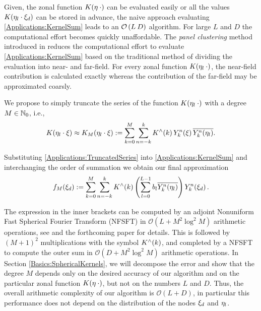 \documentclass[11pt,a4paper,twoside,bibtotoc]{scrartcl}
\theoremstyle{plain}
\theoremstyle{definition}
\theoremstyle{remark}
\numberwithin{equation}{section}
\numberwithin{table}{section}
\numberwithin{figure}{section}
\begin{document}
Given, the zonal function $K{\hspace{-0.4ex}}\left(\mathbf{\eta} \: \cdot\right)$ can be evaluated easily
or all the values $K{\hspace{-0.4ex}}\left(\mathbf{\eta}_{l} \cdot \mathbf{\xi}_{d}\right)$ can be stored in
advance, the naive approach evaluating \eqref{Applications:KernelSum} leads to
an $\mathcal{O}\left(L\:D\right)$ algorithm. 
For large $L$ and $D$ the computational effort becomes quickly unaffordable.
The \emph{panel clustering} method introduced in \cite{FrGlSch98} reduces the
computational effort to evaluate \eqref{Applications:KernelSum} based on the
traditional method of dividing the evaluation into near- and far-field.
For every zonal function $K{\hspace{-0.4ex}}\left(\mathbf{\eta}_l \: \cdot\right)$, the near-field contribution
is calculated exactly whereas the contribution of the far-field may be
approximated coarsly.

We propose to simply truncate the series of the function
$K{\hspace{-0.4ex}}\left(\mathbf{\eta}_{l}\: \cdot\right)$ with a degree $M \in \mathbb{N}_{0}$, i.e.,
\begin{equation}
  \label{Applications:TruncatedSeries}
  K{\hspace{-0.4ex}}\left(\mathbf{\eta}_{l} \cdot \mathbf{\xi}\right) \approx K_{M}{\hspace{-0.4ex}}\left(\mathbf{\eta}_{l} \cdot
  \mathbf{\xi}\right) := \sum_{k=0}^{M} \sum_{n=-k}^k K^{\wedge}{\hspace{-0.4ex}}\left(k\right)
  Y_{k}^n{\hspace{-0.4ex}}\left(\mathbf{\xi}\right) \overline{Y_{k}^n{\hspace{-0.4ex}}\left(\mathbf{\eta}_{l}\right)}.
\end{equation}

Substituting \eqref{Applications:TruncatedSeries} into
\eqref{Applications:KernelSum} and interchanging the order of summation we
obtain our final approximation
\[
  f_{M}{\hspace{-0.4ex}}\left(\xi_{d}\right) := \sum_{k=0}^{M} \sum_{n=-k}^k K^{\wedge}{\hspace{-0.4ex}}\left(k\right)
  \left(\sum_{l = 0}^{L-1} b_{l} \overline{Y_{k}^n{\hspace{-0.4ex}}\left(\mathbf{\eta}_{l}\right)}\right)
  Y_{k}^n{\hspace{-0.4ex}}\left(\mathbf{\xi}_{d}\right).
\]

The expression in the inner brackets can be computed by an adjoint Nonuniform
Fast Spherical Fourier Transform (NFSFT) in $\mathcal{O}(L + M^2 \log^2 M)$
arithmetic operations, see \cite{} and the forthcoming paper \cite{} for
details.
This is followed by $(M+1)^2$ multiplications with the symbol
$K^{\wedge}{\hspace{-0.4ex}}\left(k\right)$, and completed by a NFSFT to compute the outer sum in
$\mathcal{O}(D + M^2 \log^2 M)$ arithmetic operations.
In Section \ref{Basics:SphericalKernels}, we will decompose the error and show
that the degree $M$ depends only on the desired accuracy of our algorithm and
on the particular zonal function $K{\hspace{-0.4ex}}\left(\mathbf{\eta} \: \cdot\right)$, but not on the
numbers $L$ and $D$.
Thus, the overall arithmetic complexity of our algorithm is $\mathcal{O}(L +
D)$, in particular this performance does not depend on the distribution of the
nodes $\mathbf{\xi}_{d}$ and $\mathbf{\eta}_{l}$.
\end{document}
